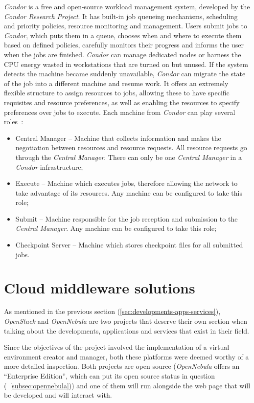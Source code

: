 \textit{Condor} is a free and open-source workload management system, developed by the \textit{Condor Research Project}.
It has built-in job queueing mechanisms, scheduling and priority policies, resource monitoring and management. Users submit jobs to \textit{Condor}, which puts them in a queue, chooses when and where to execute them based on defined policies, carefully monitors their progress and informs the user when the jobs are finished.
\textit{Condor} can manage dedicated nodes or harness the CPU energy wasted in workstations that are turned on but unused. If the system detects the machine became suddenly unavailable, \textit{Condor} can migrate the state of the job into a different machine and resume work. 
It offers an extremely flexible structure to assign resources to jobs, allowing these to have specific requisites and resource preferences, as well as enabling the resources to specify preferences over jobs to execute.
Each machine from \textit{Condor} can play several roles~\cite{jorge-ruao,condor}:
\begin{itemize}
\item Central Manager -- Machine that collects information and makes the negotiation between resources and resource requests. All resource requests go through the \textit{Central Manager}. There can only be one \textit{Central Manager} in a \textit{Condor} infrastructure;
\item Execute -- Machine which executes jobs, therefore allowing the network to take advantage of its resources. Any machine can be configured to take this role;
\item Submit -- Machine responsible for the job reception and submission to the \textit{Central Manager}. Any machine can be configured to take this role;
\item Checkpoint Server -- Machine which stores checkpoint files for all submitted jobs.
\end{itemize}


\section{Cloud middleware solutions}\label{sec:stack-nebula}

As mentioned in the previous section (\ref{sec:developments-apps-services}), \textit{OpenStack} and \textit{OpenNebula} are two projects that deserve their own section when talking about the developments, applications and services that exist in their field. 

Since the objectives of the project involved the implementation of a virtual environment creator and manager, both these platforms were deemed worthy of a more detailed inspection. Both projects are open source (\textit{OpenNebula} offers an ``Enterprise Edition'', which can put its open source status in question (~\ref{subsec:opennebula})) and one of them will run alongside the web page that will be developed and will interact with.

